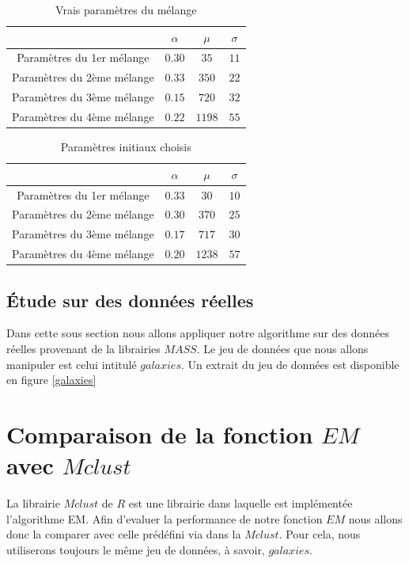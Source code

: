 \documentclass[a4paper,french,10pt]{article}
\begin{document}
\begin{table}[htp]
	\center
	\begin{tabular}{|c||c|c|c|}
		\hline
		& $\alpha$ & $\mu$ & $\sigma$\\
		\hline
		Paramètres du 1er mélange & $0.30$ & $35$ & $11$ \\
		\hline
		Paramètres du 2ème mélange & $0.33$ & $350$ & $22$ \\
		\hline
		Paramètres du 3ème mélange & $0.15$ & $720$ & $32$ \\
		\hline
		Paramètres du 4ème mélange & $0.22$ & $1198$ & $55$ \\
		\hline
	\end{tabular}
	\caption{Vrais paramètres du mélange}
	\label{tab3}
\end{table}

\begin{table}[htp]
	\center
	\begin{tabular}{|c||c|c|c|}
		\hline
		& $\alpha$ & $\mu$ & $\sigma$\\
		\hline
		Paramètres du 1er mélange & $0.33$ & $30$ & $10$ \\
		\hline
		Paramètres du 2ème mélange & $0.30$ & $370$ & $25$ \\
		\hline
		Paramètres du 3ème mélange & $0.17$ & $717$ & $30$ \\
		\hline
		Paramètres du 4ème mélange & $0.20$ & $1238$ & $57$ \\
		\hline
	\end{tabular}
	\caption{Paramètres initiaux choisis}
	\label{tab4}
\end{table}

\newpage

\subsection{Étude sur des données réelles}
Dans cette sous section nous allons appliquer notre algorithme sur des données réelles provenant de la librairies $MASS$. Le jeu de données que nous allons manipuler est celui intitulé $galaxies$. Un extrait du jeu de données est disponible en figure \ref{galaxies}


\newpage

\section{Comparaison de la fonction $EM$ avec $Mclust$}
La librairie $Mclust$ de $R$ est une librairie dans laquelle est implémentée l'algorithme EM. Afin d'evaluer la performance de notre fonction $EM$ nous allons donc la comparer avec celle prédéfini via dans la $Mclust$. Pour cela, nous utiliserons toujours le même jeu de données, à savoir, $galaxies$.
\end{document}
